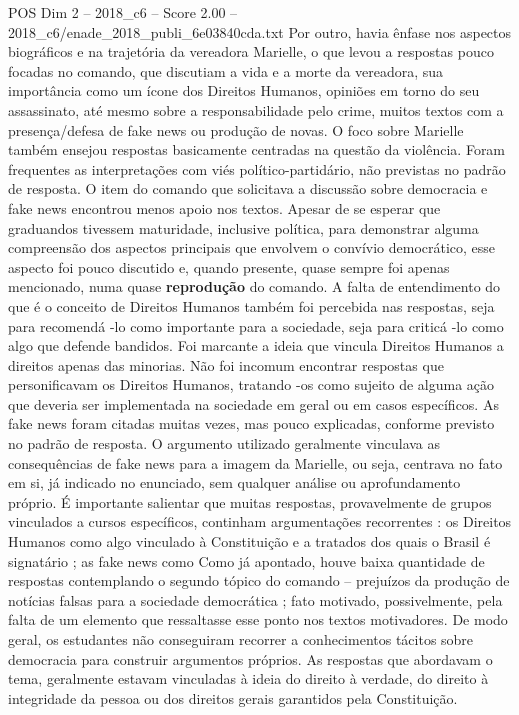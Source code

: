 \begin{textsample}{POS Dim 2 – 2018\_c6 – Score 2.00 – 2018\_c6/enade\_2018\_publi\_6e03840cda.txt}
Por outro, havia ênfase nos aspectos biográficos e na trajetória da vereadora Marielle, o que levou a respostas pouco focadas no comando, que discutiam a vida e a morte da vereadora, sua importância como um ícone dos Direitos Humanos, opiniões em torno do seu assassinato, até mesmo sobre a responsabilidade pelo crime, muitos textos com a presença/defesa de fake news ou produção de novas.
O foco sobre Marielle também ensejou respostas basicamente centradas na questão da violência.
Foram frequentes as interpretações com viés político-partidário, não previstas no padrão de resposta.
O item do comando que solicitava a discussão sobre democracia e fake news encontrou menos apoio nos textos.
Apesar de se esperar que graduandos tivessem maturidade, inclusive política, para demonstrar alguma compreensão dos aspectos principais que envolvem o convívio democrático, esse aspecto foi pouco discutido e, quando presente, quase sempre foi apenas mencionado, numa quase \textbf{reprodução} do comando.
A falta de entendimento do que é o conceito de Direitos Humanos também foi percebida nas respostas, seja para recomendá -lo como importante para a sociedade, seja para criticá -lo como algo que defende bandidos.
Foi marcante a ideia que vincula Direitos Humanos a direitos apenas das minorias.
Não foi incomum encontrar respostas que personificavam os Direitos Humanos, tratando -os como sujeito de alguma ação que deveria ser implementada na sociedade em geral ou em casos específicos.
As fake news foram citadas muitas vezes, mas pouco explicadas, conforme previsto no padrão de resposta.
O argumento utilizado geralmente vinculava as consequências de fake news para a imagem da Marielle, ou seja, centrava no fato em si, já indicado no enunciado, sem qualquer análise ou aprofundamento próprio.
É importante salientar que muitas respostas, provavelmente de grupos vinculados a cursos específicos, continham argumentações recorrentes : os Direitos Humanos como algo vinculado à Constituição e a tratados dos quais o Brasil é signatário ; as fake news como Como já apontado, houve baixa quantidade de respostas contemplando o segundo tópico do comando – prejuízos da produção de notícias falsas para a sociedade democrática ; fato motivado, possivelmente, pela falta de um elemento que ressaltasse esse ponto nos textos motivadores.
De modo geral, os estudantes não conseguiram recorrer a conhecimentos tácitos sobre democracia para construir argumentos próprios.
As respostas que abordavam o tema, geralmente estavam vinculadas à ideia do direito à verdade, do direito à integridade da pessoa ou dos direitos gerais garantidos pela Constituição.

\end{textsample}

